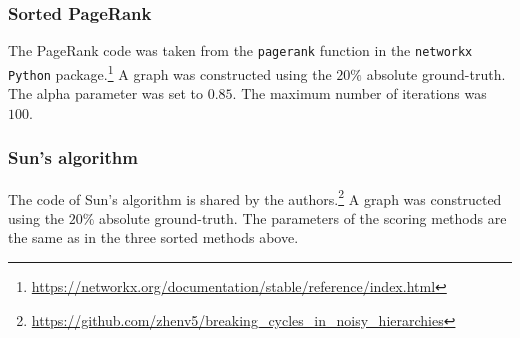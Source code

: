 \subsubsection{Sorted PageRank}

The PageRank code was taken from the \texttt{pagerank} function in the \texttt{networkx} \texttt{Python} package.\footnote{\href{https://networkx.org/documentation/stable/reference/index.html}{https://networkx.org/documentation/stable/reference/index.html}} A graph was constructed using the $20\%$ absolute ground-truth. The alpha parameter was set to $0.85$. The maximum number of iterations was $100$.


\subsubsection{Sun's algorithm}

The code of Sun's algorithm is shared by the authors.\footnote{\href{https://github.com/zhenv5/breaking_cycles_in_noisy_hierarchies}{https://github.com/zhenv5/breaking\_cycles\_in\_noisy\_hierarchies}} A graph was constructed using the $20\%$ absolute ground-truth. The parameters of the scoring methods are the same as in the three sorted methods above.
